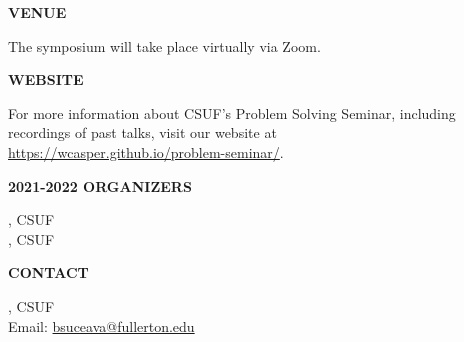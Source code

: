 \documentclass[a4paper]{article}
\begin{document}
\begin{minipage}{0.95\textwidth}
\begin{minipage}[b]{0.47\textwidth}
\vspace{0.2in}
\medskip

\large{\color{csecondary}\textbf{VENUE}}

The symposium will take place virtually via Zoom.

\medskip

\large{\color{csecondary}\textbf{WEBSITE}}

For more information about CSUF's Problem Solving Seminar, including recordings of past talks, visit our website at\\ \href{https://wcasper.github.io/problem-seminar/}{https://wcasper.github.io/problem-seminar/}.

\medskip
\textbf{\color{csecondary}\large 2021-2022 ORGANIZERS}\par
{}, CSUF\\
, CSUF

\medskip

\textbf{\color{csecondary}\large CONTACT }\par

, CSUF\\
Email: \href{mailto:bsuceava@fullerton.edu}{bsuceava@fullerton.edu}

\rule{0pt}{78pt}
\end{minipage}
\vspace*{-70pt}

\end{minipage}
\end{document}
